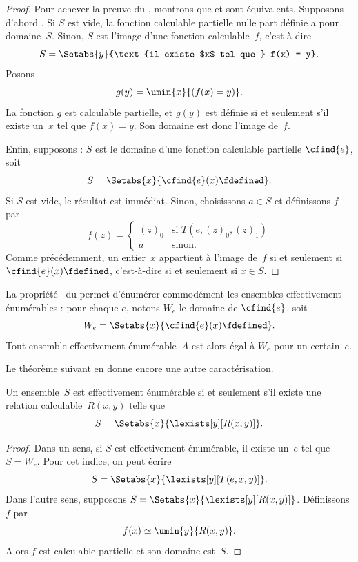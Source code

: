 \documentclass[../../../include/open-logic-section]{subfiles}
\begin{document}
\begin{proof}
Pour achever la preuve du ,
montrons que  et
 sont équivalents. Supposons
d'abord . Si $S$ est vide, la
fonction calculable partielle nulle part définie a
pour domaine~$S$. Sinon, $S$ est l'image d'une
fonction calculable~$f$, c'est-à-dire
\[
S = \Setabs{y}{\text{il existe $x$ tel que } f(x) = y}.
\]
Posons
\[
g(y) = \umin{x}{(f(x) = y)}.
\]
La fonction $g$ est calculable partielle, et $g(y)$
est définie si et seulement s'il existe un~$x$ tel
que $f(x)=y$. Son domaine est donc l'image de~$f$.

Enfin, supposons  : $S$ est
le domaine d'une fonction calculable partielle
$\cfind{e}$, soit
\[
S = \Setabs{x}{\cfind{e}(x) \fdefined}.
\]
Si $S$ est vide, le résultat est immédiat. Sinon,
choisissons $a\in S$ et définissons $f$ par
\[
f(z) = \begin{cases}
(z)_0 & \text{si $T(e,(z)_0,(z)_1)$} \\
a & \text{sinon.}
\end{cases}
\]
Comme précédemment, un entier~$x$ appartient à
l'image de~$f$ si et seulement si
$\cfind{e}(x)\fdefined$, c'est-à-dire si et
seulement si $x\in S$. 
\end{proof}

La propriété~ du
 permet d'énumérer commodément
les ensembles effectivement énumérables : pour chaque
$e$, notons $W_e$ le domaine de $\cfind{e}$, soit
\[
W_e = \Setabs{x}{\cfind{e}(x) \fdefined}.
\]
Tout ensemble effectivement énumérable~$A$ est alors
égal à $W_e$ pour un certain~$e$.

Le théorème suivant en donne encore une autre
caractérisation.

\begin{thm}
Un ensemble~$S$ est effectivement énumérable si et
seulement s'il existe une relation calculable~$R(x,y)$
telle que
\[
S = \Setabs{ x }{ \lexists[y][R(x,y)] }.
\]
\end{thm}

\begin{proof}
Dans un sens, si $S$ est effectivement énumérable,
il existe un~$e$ tel que $S=W_e$. Pour cet indice,
on peut écrire
\[
S = \Setabs{ x }{ \lexists[y][T(e, x, y)] }.
\]
Dans l'autre sens, supposons
$S=\Setabs{ x }{ \lexists[y][R(x, y)] }$.
Définissons $f$ par
\[
f(x) \simeq \umin{y}{R(x, y)}.
\]
Alors $f$ est calculable partielle et son domaine
est~$S$.
\end{proof}
\end{document}
